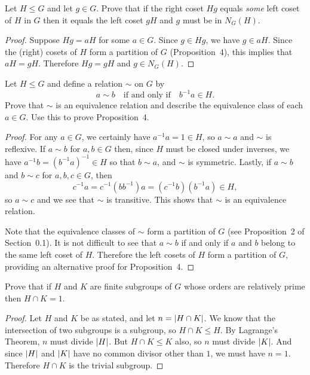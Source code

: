  Let $H\leq G$ and let $g\in G$. Prove that if the right
coset $Hg$ equals {\em some} left coset of $H$ in $G$ then it equals
the left coset $gH$ and $g$ must be in $N_G(H)$.
\begin{proof}
  Suppose $Hg = aH$ for some $a\in G$. Since $g\in Hg$, we have
  $g\in aH$. Since the (right) cosets of $H$ form a partition of $G$
  (Proposition~4), this implies that $aH = gH$. Therefore $Hg = gH$
  and $g\in N_G(H)$.
\end{proof}

 Let $H\leq G$ and define a relation $\sim$ on $G$ by
\begin{equation*}
  a\sim b \quad\text{if and only if}\quad b^{-1}a\in H.
\end{equation*}
Prove that $\sim$ is an equivalence relation and describe the
equivalence class of each $a\in G$. Use this to prove Proposition~4.
\begin{proof}
  For any $a\in G$, we certainly have $a^{-1}a = 1\in H$, so $a\sim a$
  and $\sim$ is reflexive. If $a\sim b$ for $a,b\in G$ then, since $H$
  must be closed under inverses, we have
  $a^{-1}b = (b^{-1}a)^{-1} \in H$ so that $b\sim a$, and $\sim$ is
  symmetric. Lastly, if $a\sim b$ and $b\sim c$ for $a,b,c\in G$, then
  \begin{equation*}
    c^{-1}a
    = c^{-1}(bb^{-1})a
    = (c^{-1}b)(b^{-1}a) \in H,
  \end{equation*}
  so $a\sim c$ and we see that $\sim$ is transitive. This shows that
  $\sim$ is an equivalence relation.

  Note that the equivalence classes of $\sim$ form a partition of $G$
  (see Proposition~2 of Section~0.1). It is not difficult to see that
  $a\sim b$ if and only if $a$ and $b$ belong to the same left coset
  of $H$. Therefore the left cosets of $H$ form a partition of $G$,
  providing an alternative proof for Proposition~4.
\end{proof}

 Prove that if $H$ and $K$ are finite subgroups of $G$ whose
orders are relatively prime then $H\cap K = 1$.
\begin{proof}
  Let $H$ and $K$ be as stated, and let $n = \lvert{H\cap K}\rvert$. We know
  that the intersection of two subgroups is a subgroup, so
  $H\cap K\leq H$. By Lagrange's Theorem, $n$ must divide
  $\lvert{H}\rvert$. But $H\cap K\leq K$ also, so $n$ must divide
  $\lvert{K}\rvert$. And since $\lvert{H}\rvert$ and $\lvert{K}\rvert$ have no common divisor
  other than $1$, we must have $n = 1$. Therefore $H\cap K$ is the
  trivial subgroup.
\end{proof}
